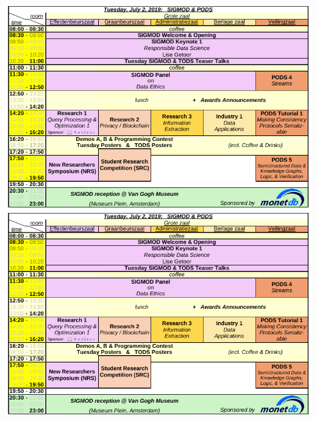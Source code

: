 \ifodd\value{page}
\includegraphics[angle=270,width=\textwidth]{schedule/p3.pdf}%
\else
\includegraphics[angle=90,width=\textwidth]{schedule/p3.pdf}%
\fi

\newpage


